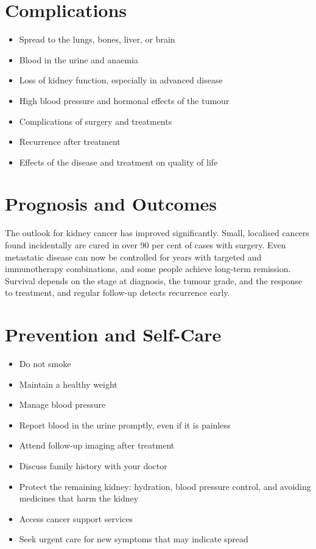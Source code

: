 \section*{Complications}
\begin{itemize}
    \item Spread to the lungs, bones, liver, or brain
    \item Blood in the urine and anaemia
    \item Loss of kidney function, especially in advanced disease
    \item High blood pressure and hormonal effects of the tumour
    \item Complications of surgery and treatments
    \item Recurrence after treatment
    \item Effects of the disease and treatment on quality of life
\end{itemize}

\section*{Prognosis and Outcomes}
The outlook for kidney cancer has improved significantly. Small, localised cancers found incidentally are cured in over 90 per cent of cases with surgery. Even metastatic disease can now be controlled for years with targeted and immunotherapy combinations, and some people achieve long-term remission. Survival depends on the stage at diagnosis, the tumour grade, and the response to treatment, and regular follow-up detects recurrence early.

\section*{Prevention and Self-Care}
\begin{itemize}
    \item Do not smoke
    \item Maintain a healthy weight
    \item Manage blood pressure
    \item Report blood in the urine promptly, even if it is painless
    \item Attend follow-up imaging after treatment
    \item Discuss family history with your doctor
    \item Protect the remaining kidney: hydration, blood pressure control, and avoiding medicines that harm the kidney
    \item Access cancer support services
    \item Seek urgent care for new symptoms that may indicate spread
\end{itemize}

